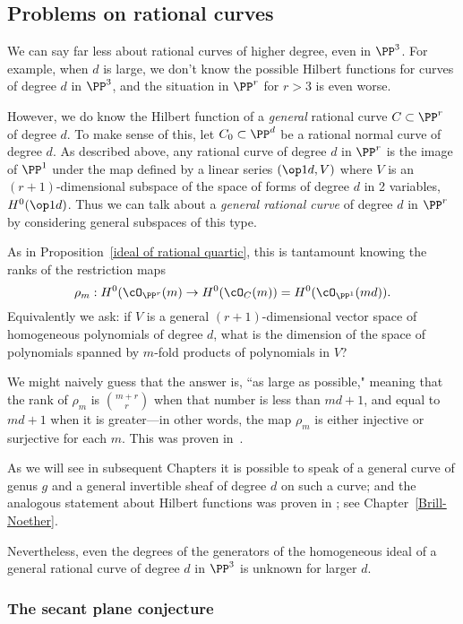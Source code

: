 \subsection{Problems on rational curves}

We can say far less about rational curves of higher degree, even in $\PP^3$. For example, when $d$ is large, we
don't know the possible Hilbert functions for curves of degree $d$ in $\PP^3$, and the situation in $\PP^r$ for
$r>3$ is even worse.

However, we do know the Hilbert function of a \emph{general} rational curve $C \subset \PP^r$ of degree $d$. To make sense of this, let $C_0 \subset \PP^d$ be a rational normal curve of degree $d$. 
As described above, any rational curve of degree $d$ in $\PP^r$ is the image of $\PP^1$ under the map defined by
a linear series $(\op1d, V)$ where $V$ is an $(r+1)$-dimensional subspace of the space of
forms of degree $d$ in 2 variables, $H^0(\op1d)$. Thus we can talk about a \emph{general rational curve} of degree $d$ in $\PP^r$ by considering general subspaces of this type.

As in Proposition~\ref{ideal of rational quartic}, this is tantamount knowing the ranks of the restriction maps
$$
\rho_m : H^0(\cO_{\PP^r}(m) \to H^0(\cO_C(m)) = H^0(\cO_{\PP^1}(md)).
$$
Equivalently we ask: if $V$ is a general  $(r+1)$-dimensional vector space of homogeneous polynomials of degree $d$, what is the dimension of the space of polynomials spanned by $m$-fold products of polynomials in $V$? 

We might naively guess that the answer is, ``as large as possible," meaning that the rank of $\rho_m$ is $\binom{m+r}{r}$ when that number is less than $md+1$, and equal to $md+1$ when it is greater---in other words, the map $\rho_m$ is either injective or surjective for each $m$. This was proven in~\cite{Ballico-Ellia83}. 

As we will see in subsequent Chapters it is possible to speak of a general curve of genus $g$
and a general invertible sheaf of degree $d$ on such a curve; and the analogous statement 
about Hilbert functions  was proven in \cite{ELarson2018}; see Chapter~\ref{Brill-Noether}.

Nevertheless, even the degrees of the generators of the homogeneous ideal of a general
rational curve of degree $d$ in $\PP^3$ is unknown for larger $d$. 

\subsubsection{The secant plane conjecture}

